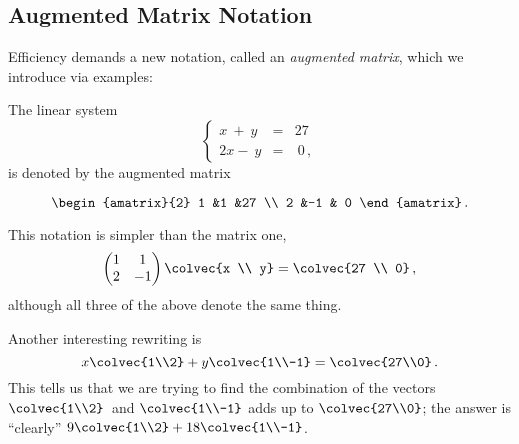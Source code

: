 \subsection{Augmented Matrix Notation}

Efficiency demands a new notation, called an \hypertarget{augmented_matrix}{\emph{augmented matrix}},
which we  introduce via examples: 

The linear system
\[\left\{ 
\begin{array}{rcr}
	x\ +\ y & = & 27 \\
	2x-\ y & = &\  0\, ,
\end{array}\right.
\]
is denoted by the augmented matrix

\[
\begin{amatrix}{2}
1 &1 &27 \\ 2 &-1 & 0
\end{amatrix}\, .
\]

\noindent
This notation is  simpler than the matrix one, 
\begin{equation*}
    \begin{pmatrix}
      1             &1  \\
      2             &-1
    \end{pmatrix}
  \colvec{x \\ y}
  =
  \colvec{27 \\ 0}\, ,
\end{equation*}
although all three of the above denote the same thing. 


\noindent
Another interesting rewriting is
\[
x\colvec{1\\2}+y\colvec{1\\-1}=\colvec{27\\0}\, .
\]
This tells us that we are trying to find the combination of the vectors $\colvec{1\\2}$~and $\colvec{1\\-1}$ adds up to $\colvec{27\\0}$; 
 the answer is  ``clearly'' $9\colvec{1\\2}+18\colvec{1\\-1}$.\\[1mm]


